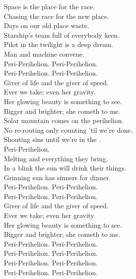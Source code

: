 Space is the place for the  race. \\
Chasing the race for the new place. \\
Days on our old place waste. \\
Starship's team full of everybody keen. \\
Pilot in the twilight is a deep dream. \\
Man and machine convene. \\

Peri-Perihelion. Peri-Perihelion. \\
Peri-Perihelion. Peri-Perihelion. \\

Giver of life and the giver of speed. \\
Ever we take; even her gravity. \\
Her glowing beauty is something to see. \\
Bigger and brighter; she cometh to me. \\

Solar mountain comes on the perihelion. \\
No re-routing only counting 'til we're done. \\
Shouting sins until we're in the . \\
Peri-Perihelion. \\
Melting  and everything they bring. \\
In a blink the sun will drink their things. \\
Grinning sun has sinners for dinner. \\

Peri-Perihelion. Peri-Perihelion. \\
Peri-Perihelion. Peri-Perihelion. \\

Giver of life and the giver of speed. \\
Ever we take; even her gravity. \\
Her glowing beauty is something to see. \\
Bigger and brighter; she cometh to me. \\

Peri-Perihelion. Peri-Perihelion. \\
Peri-Perihelion. Peri-Perihelion. \\
Peri-Perihelion. Peri-Perihelion. \\
Peri-Perihelion. Peri-Perihelion. \\

